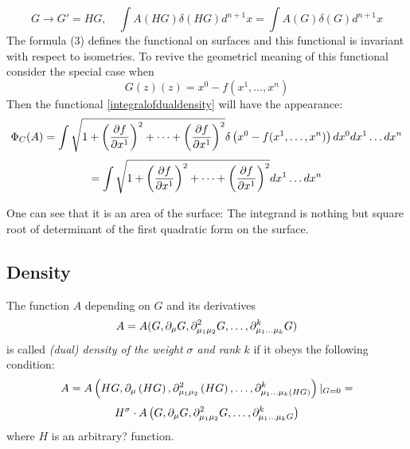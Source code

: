 \documentclass[12pt]{article}
\theoremstyle{theorem}
\begin{document}
              $$
     G\to G'=HG,\quad \int A(HG)\delta(HG)d^{n+1}x=\int A(G)\delta(G)d^{n+1}x
              $$
The formula (3) defines the functional on surfaces and this functional is
invariant with respect to isometries. To revive  the geometricl meaning of this functional
consider the special case when
\begin{equation}\label{specialcase}
    G(z)(z)=x^0-f(x^1,\dots,x^n)
\end{equation}
Then the functional  \eqref{integralofdualdensity} will have the appearance:
\begin{equation}\label{specialapp}
\Phi_C(A)=\int \sqrt
                 {
                 1+
    \left({\partial f\over\partial x^1}\right)^2+
                   \dots+
    \left({\partial f\over\partial x^1}\right)^2
                  }\delta
      \left(x^0-f(x^1,\dots,x^n)\right)
      dx^0 dx^1\dots dx^n
\end{equation}
\begin{equation}\label{specialapp2}
   =\int \sqrt
                 {
                 1+
    \left({\partial f\over\partial x^1}\right)^2+
                   \dots+
    \left({\partial f\over\partial x^1}\right)^2
                  } dx^1\dots dx^n
\end{equation}

One can see that it is an area of the surface: The integrand is nothing but
square root of determinant of the first quadratic form on the surface.



\subsection {Density}

The function $A$ depending on $G$ and its derivatives
\begin{equation}\label{dualdensity}
    A=A(G,\partial_\mu G, \partial^2_{\mu_{1}\mu_2}G,\dots,\partial^k_{\mu_{1}\dots{\mu_k}}G)
\end{equation}
is called  {\it (dual) density of the weight $\sigma$ and rank $k$}
if it obeys the following condition:
                $$
    A=A\left(
    HG,\partial_\mu\left(H G\right), \partial^2_{\mu_{1}\mu_2}\left(H G\right),\dots,
    \partial^k_{\mu_{1}\dots{\mu_k}\left(H G\right)}
    \right)
    \vert_{G=0}=
    $$
    \begin{equation}\label{densityweightdefinition}
    H^\sigma\cdot
    A\left(
    G,\partial_\mu G, \partial^2_{\mu_{1}\mu_2}G,\dots,\partial^k_{\mu_{1}\dots{\mu_k}G}
    \right)
\end{equation}
where $H$ is an arbitrary? function.
\end{document}
